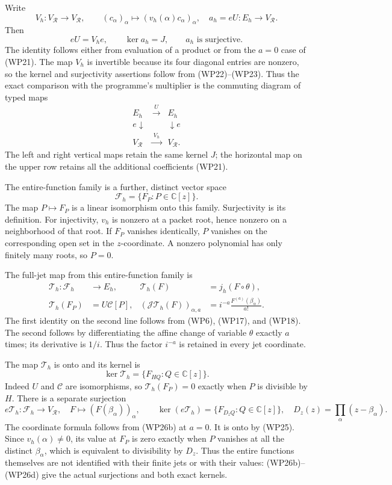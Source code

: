\documentclass[
  10pt,
  a4paper,
]{article}
\begin{document}
Write \[
V_h:V_{\mathcal R}\longrightarrow V_{\mathcal R},\qquad
(c_\alpha)_\alpha\longmapsto(v_h(\alpha)c_\alpha)_\alpha,
\quad
a_h=eU:E_h\longrightarrow V_{\mathcal R}.
\tag{WP24}
\] Then \[
eU=V_he,\qquad \ker a_h=J,
\qquad a_h\text{ is surjective}.
\tag{WP25}
\] The identity follows either from evaluation of a product or from the
\(a=0\) case of (WP21). The map \(V_h\) is invertible because its four
diagonal entries are nonzero, so the kernel and surjectivity assertions
follow from (WP22)--(WP23). Thus the exact comparison with the
programme's multiplier is the commuting diagram of typed maps \[
\begin{array}{ccc}
E_h&\xrightarrow{\ U\ }&E_h\\
e\downarrow&&\downarrow e\\
V_{\mathcal R}&\xrightarrow{\ V_h\ }&V_{\mathcal R}.
\end{array}
\tag{WP26}
\] The left and right vertical maps retain the same kernel \(J\); the
horizontal map on the upper row retains all the additional coefficients
(WP21).

The entire-function family is a further, distinct vector space \[
\mathcal F_h=\{F_P:P\in\mathbb C[z]\}.
\tag{WP26a}
\] The map \(P\mapsto F_P\) is a linear isomorphism onto this family.
Surjectivity is its definition. For injectivity, \(v_h\) is nonzero at a
packet root, hence nonzero on a neighborhood of that root. If \(F_P\)
vanishes identically, \(P\) vanishes on the corresponding open set in
the \(z\)-coordinate. A nonzero polynomial has only finitely many roots,
so \(P=0\).

The full-jet map from this entire-function family is \[
\begin{aligned}
\mathcal T_h:\mathcal F_h&\longrightarrow E_h,
&\mathcal T_h(F)&=j_h(F\circ\theta),\\
\mathcal T_h(F_P)&=U\mathcal C[P],
&(\mathcal J\mathcal T_h(F))_{\alpha,a}
&=i^{-a}\frac{F^{(a)}(\beta_\alpha)}{a!}.
\end{aligned}
\tag{WP26b}
\] The first identity on the second line follows from (WP6), (WP17), and
(WP18). The second follows by differentiating the affine change of
variable \(\theta\) exactly \(a\) times; its derivative is \(1/i\). Thus
the factor \(i^{-a}\) is retained in every jet coordinate.

The map \(\mathcal T_h\) is onto and its kernel is \[
\ker\mathcal T_h=\{F_{HQ}:Q\in\mathbb C[z]\}.
\tag{WP26c}
\] Indeed \(U\) and \(\mathcal C\) are isomorphisms, so
\(\mathcal T_h(F_P)=0\) exactly when \(P\) is divisible by \(H\). There
is a separate surjection \[
e\mathcal T_h:\mathcal F_h\longrightarrow V_{\mathcal R},
\quad F\longmapsto(F(\beta_\alpha))_\alpha,
\qquad
\ker(e\mathcal T_h)=\{F_{D_zQ}:Q\in\mathbb C[z]\},
\quad D_z(z)=\prod_\alpha(z-\beta_\alpha).
\tag{WP26d}
\] The coordinate formula follows from (WP26b) at \(a=0\). It is onto by
(WP25). Since \(v_h(\alpha)\ne0\), its value at \(F_P\) is zero exactly
when \(P\) vanishes at all the distinct \(\beta_\alpha\), which is
equivalent to divisibility by \(D_z\). Thus the entire functions
themselves are not identified with their finite jets or with their
values: (WP26b)--(WP26d) give the actual surjections and both exact
kernels.
\end{document}
